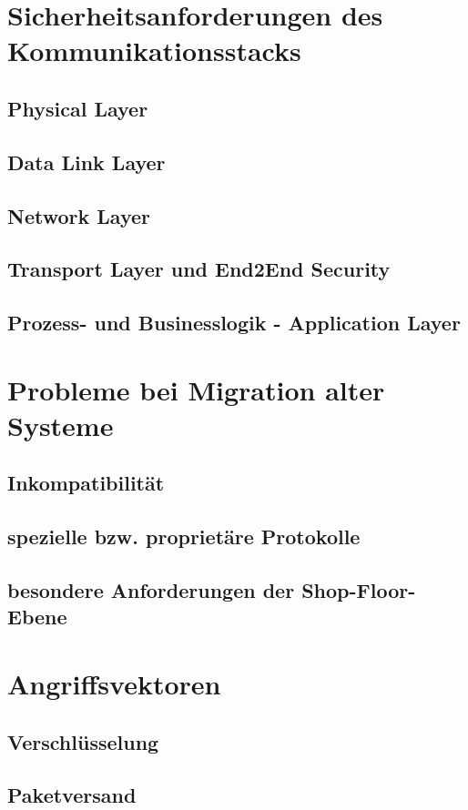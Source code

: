 \section{Sicherheitsanforderungen des Kommunikationsstacks}
\subsection{Physical Layer}
\subsection{Data Link Layer}
\subsection{Network Layer}
\subsection{Transport Layer und End2End Security}
\subsection{Prozess- und Businesslogik - Application Layer}

\section{Probleme bei Migration alter Systeme}
\subsection{Inkompatibilität}
\subsection{spezielle bzw. proprietäre Protokolle}
\subsection{besondere Anforderungen der Shop-Floor-Ebene}

\section{Angriffsvektoren}
\subsection{Verschlüsselung}
\subsection{Paketversand}
